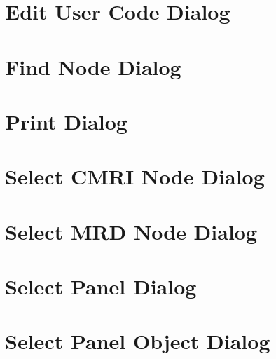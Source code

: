 \section{Edit User Code Dialog}
\section{Find Node Dialog}
\section{Print Dialog}
\section{Select CMRI Node Dialog}
\section{Select MRD Node Dialog}
\section{Select Panel Dialog}
\section{Select Panel Object Dialog}

